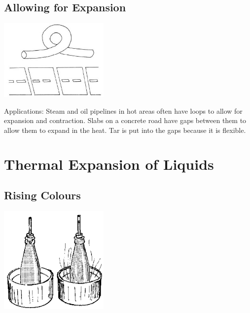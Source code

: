\begin{multicols}{2}
\subsection{Allowing for Expansion}

\begin{center}
\includegraphics[width=0.4\textwidth]{./img/vso/allowing-expansion.jpg}
\end{center}

\begin{description*}
\item[Applications:]{Steam and oil pipelines in hot areas often have loops to allow for expansion and contraction. Slabs on a concrete road have gaps between them to allow them to expand in the heat. Tar is put into the gaps because it is flexible.}
\end{description*}


\section*{Thermal Expansion of Liquids} 


\subsection{Rising Colours}

\begin{center}
\includegraphics[width=0.4\textwidth]{./img/source/rising-colours.png}
\end{center}


\end{multicols}
